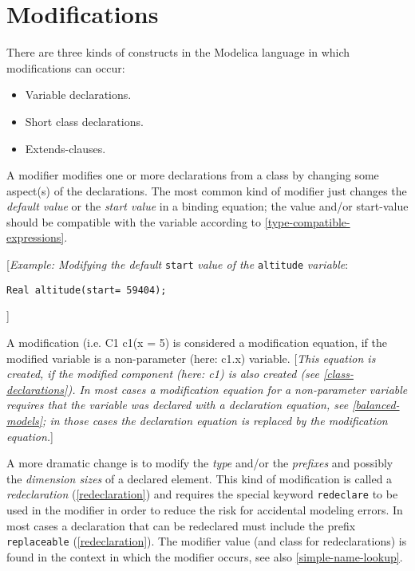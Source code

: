 \section{Modifications}

There are three kinds of constructs in the Modelica language in which
modifications can occur:

\begin{itemize}
\item
  Variable declarations.
\item
  Short class declarations.
\item
  Extends-clauses.
\end{itemize}

A modifier modifies one or more declarations from a class by changing
some aspect(s) of the declarations. The most common kind of modifier
just changes the \emph{default value} or the \emph{start value} in a
binding equation; the value and/or start-value should be compatible with
the variable according to \autoref{type-compatible-expressions}.

{[}\emph{Example: Modifying the default} \lstinline!start! \emph{value of the}
\lstinline!altitude! \emph{variable}:
\begin{lstlisting}[language=modelica]
Real altitude(start= 59404);
\end{lstlisting}
{]}

A modification (i.e. C1 c1(x = 5) is considered a modification equation,
if the modified variable is a non-parameter (here: c1.x) variable.
{[}\emph{This equation is created, if the modified component (here: c1)
is also created (see \autoref{class-declarations}). In most cases a
modification equation for a non-parameter variable requires that the
variable was declared with a declaration equation, see \autoref{balanced-models};
in those cases the declaration equation is replaced by the
modification equation.}{]}

A more dramatic change is to modify the \emph{type} and/or the
\emph{prefixes} and possibly the \emph{dimension sizes} of a declared
element. This kind of modification is called a \emph{redeclaration}
(\autoref{redeclaration}) and requires the special keyword \lstinline!redeclare! to be used in
the modifier in order to reduce the risk for accidental modeling errors.
In most cases a declaration that can be redeclared must include the
prefix \lstinline!replaceable! (\autoref{redeclaration}). The modifier value (and class for
redeclarations) is found in the context in which the modifier occurs,
see also \autoref{simple-name-lookup}.

